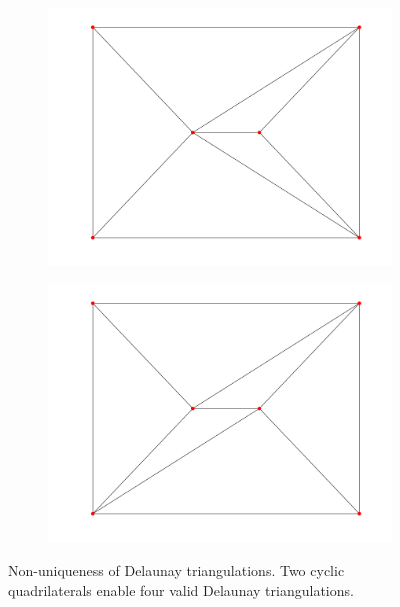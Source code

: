 \begin{figure}[ht]
\begin{subfigure}[b]{0.2\textwidth}
        \centering
        \includegraphics[width=\textwidth]{report/Images/Theory/triangulation/triangulation_delaunay2.png}
        \label{fig:triangulation-delaunay2}
    \end{subfigure}
    \hfill
    \begin{subfigure}[b]{0.2\textwidth}
        \centering
        \includegraphics[width=\textwidth]{report/Images/Theory/triangulation/triangulation_delaunay4.png}
        \label{fig:triangulation-delaunay4}
    \end{subfigure}
    \caption[Non-uniqueness of Delaunay triangulations]{Non-uniqueness of Delaunay triangulations. Two cyclic quadrilaterals enable four valid Delaunay triangulations.}
    \label{fig:non-unique-delaunay}
\end{figure}



